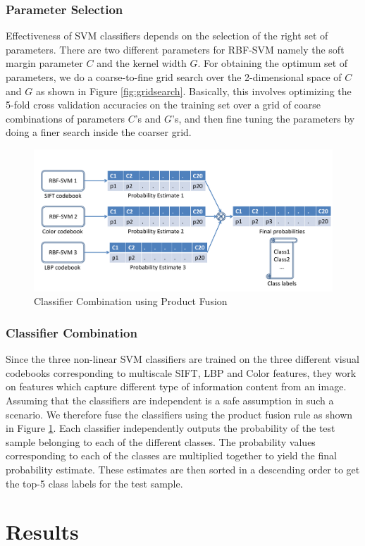 \documentclass[12pt]{article}
\begin{document}
\subsubsection{Parameter Selection}
Effectiveness of SVM classifiers depends on the selection of the right set of parameters. There are two different parameters for RBF-SVM namely the soft margin parameter $C$ and the kernel width $G$. For obtaining the optimum set of parameters, we do a coarse-to-fine grid search over the 2-dimensional space of $C$ and $G$ as shown in Figure \ref{fig:gridsearch}. Basically, this involves optimizing the 5-fold cross validation accuracies on the training set over a grid of coarse combinations of parameters $C$'s and $G$'s, and then fine tuning the parameters by doing a finer search inside the coarser grid.

\begin{figure}
\includegraphics[width = 1\textwidth]{classifiercombination}
\caption{Classifier Combination using Product Fusion}
\label{fig:classifiercombination}
\end{figure}

\subsubsection{Classifier Combination}
Since the three non-linear SVM classifiers are trained on the three different visual codebooks corresponding to multiscale SIFT, LBP and Color features, they work on features which capture different type of information content from an image. Assuming that the classifiers are independent is a safe assumption in such a scenario. We therefore fuse the classifiers using the product fusion rule as shown in Figure \ref{fig:classifiercombination}. Each classifier independently outputs the probability of the test sample belonging to each of the different classes. The probability values corresponding to each of the classes are multiplied together to yield the final probability estimate. These estimates are then sorted in a descending order to get the top-5 class labels for the test sample.

\section{Results}




\end{document}
